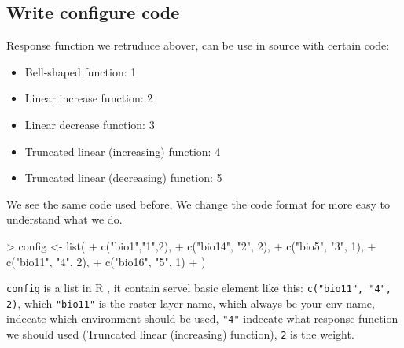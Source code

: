 \documentclass{report}
\newcommand{\R}{{\normalfont\textsf{R }}{}}
\begin{document}
\subsection*{Write configure code}
Response function we retruduce abover, can be use in source with certain code:
\begin{itemize}
    \item Bell-shaped function: 1
    \item Linear increase function: 2
    \item Linear decrease function: 3
    \item Truncated linear (increasing) function: 4
    \item Truncated linear (decreasing) function: 5
\end{itemize}
We see the same code used before, We change the code format for more easy to understand what we do.
\begin{Schunk}
\begin{Sinput}
> config <- list(
+     c("bio1","1",2),
+     c("bio14", "2", 2),
+     c("bio5", "3", 1),
+     c("bio11", "4", 2),
+     c("bio16", "5", 1)
+     )
\end{Sinput}
\end{Schunk}
\texttt{config} is a list in \R, it contain servel basic element like this:
\texttt{c("bio11", "4", 2)}, which \texttt{"bio11"} is the raster layer name, which always be your env name, indecate which
environment should be used, \texttt{"4"} indecate what response function we should used (Truncated linear (increasing) function), \texttt{2} is the weight.
\end{document}
